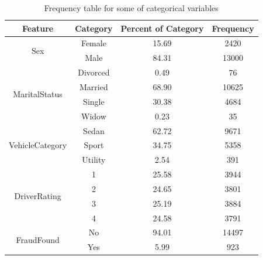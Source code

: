 \documentclass[12pt]{article}
\begin{document}
    \begin{table}[H]
        \centering
        \small
        \caption{Frequency table for some of categorical variables}
        \scriptsize
        \begin{tabular}{lrrr}
            \hline
            \multicolumn{1}{c}{Feature} & \multicolumn{1}{c}{Category} & \multicolumn{1}{c}{Percent of Category} &\multicolumn{1}{c}{Frequency} \\
            \hline
            \multicolumn{1}{c}{\multirow{2}{*}{Sex}} & \multicolumn{1}{c}{Female} & \multicolumn{1}{c}{15.69}  &\multicolumn{1}{c}{2420} \\
            \multicolumn{1}{c}{} & \multicolumn{1}{c}{Male} & \multicolumn{1}{c}{84.31}  &\multicolumn{1}{c}{13000} \\
            \hline
            \multicolumn{1}{c}{\multirow{4}{*}{MaritalStatus}} & \multicolumn{1}{c}{Divorced} & \multicolumn{1}{c}{0.49}  &\multicolumn{1}{c}{76} \\
            \multicolumn{1}{c}{} & \multicolumn{1}{c}{Married} & \multicolumn{1}{c}{68.90} &\multicolumn{1}{c}{10625} \\
            \multicolumn{1}{c}{} & \multicolumn{1}{c}{Single} & \multicolumn{1}{c}{30.38}  &\multicolumn{1}{c}{4684} \\
            \multicolumn{1}{c}{} & \multicolumn{1}{c}{Widow} & \multicolumn{1}{c}{0.23}  &\multicolumn{1}{c}{35} \\
            \hline
            \multicolumn{1}{c}{\multirow{3}{*}{VehicleCategory}} & \multicolumn{1}{c}{Sedan} & \multicolumn{1}{c}{62.72} &\multicolumn{1}{c}{9671} \\
            \multicolumn{1}{c}{} & \multicolumn{1}{c}{Sport} & \multicolumn{1}{c}{34.75}  &\multicolumn{1}{c}{5358} \\
            \multicolumn{1}{c}{} & \multicolumn{1}{c}{Utility} & \multicolumn{1}{c}{2.54} &\multicolumn{1}{c}{391} \\
            \hline
            \multicolumn{1}{c}{\multirow{4}{*}{DriverRating}} & \multicolumn{1}{c}{1} & \multicolumn{1}{c}{25.58}  &\multicolumn{1}{c}{3944} \\
            \multicolumn{1}{c}{} & \multicolumn{1}{c}{2} & \multicolumn{1}{c}{24.65}  &\multicolumn{1}{c}{3801} \\
            \multicolumn{1}{c}{} & \multicolumn{1}{c}{3} & \multicolumn{1}{c}{25.19}  &\multicolumn{1}{c}{3884} \\
            \multicolumn{1}{c}{} & \multicolumn{1}{c}{4} & \multicolumn{1}{c}{24.58}  &\multicolumn{1}{c}{3791} \\
            \hline
            \multicolumn{1}{c}{\multirow{2}{*}{FraudFound}} & \multicolumn{1}{c}{No} & \multicolumn{1}{c}{94.01}  &\multicolumn{1}{c}{14497} \\
            \multicolumn{1}{c}{} & \multicolumn{1}{c}{Yes} & \multicolumn{1}{c}{5.99}  &\multicolumn{1}{c}{923} \\
            \hline
        \end{tabular}
    \end{table}
\end{document}
